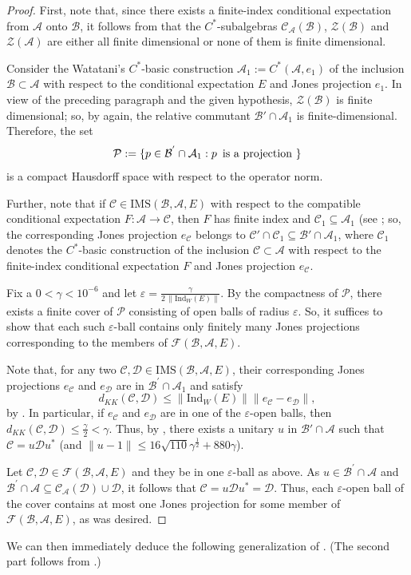 \documentclass{amsart}
\numberwithin{equation}{section}
\newcommand{\IMS}{\mathrm{IMS}}
\newcommand{\mcal}{\mathcal}
\newcommand{\1}{\mathbf{1}}
\newcommand{\mA}{\mathcal{A}}
\newcommand{\mB}{\mathcal{B}}
\newcommand{\mC}{\mathcal{C}}
\newcommand{\mD}{\mathcal{D}}
\newcommand{\mZ}{\mathcal{Z}}
\begin{document}
\begin{proof}
First,   note that,   since there exists a finite-index conditional
  expectation from $\mA$ onto $\mB$, it follows from \cite[Proposition
    2.7.3]{Wat} that the $C^*$-subalgebras $\mcal{C}_{\mA}(\mB)$,
  $\mcal{Z}(\mB)$ and  $\mcal{Z}(\mA)$ are either all finite
  dimensional or none of them is finite dimensional.


  Consider the Watatani's $C^*$-basic construction $\mA_1:=C^*(\mA,
  e_1)$ of the inclusion $\mB \subset \mA$ with respect to the
  conditional expectation $E$ and Jones projection $e_1$. In view of
  the preceding paragraph and the given hypothesis, $\mZ(\mB)$ is finite
  dimensional; so, by \cite[Proposition 2.7.3]{Wat} again, the
  relative commutant $\mB'\cap \mA_1$ is finite-dimensional.  Therefore,
  the set
\[
\mathcal{P}:=\{p\in \mB^{'}\cap \mA_1 :   p \mbox{\, is a projection }\}   
\]
is a compact Hausdorff space with respect to the operator norm.

Further, note that if $\mC \in \IMS(\mB, \mA, E)$ with respect to the
compatible conditional expectation $F: \mA \to \mC$, then $F$ has
finite index and $\mC_1 \subseteq \mA_1$ (see \cite[Prop. 2.7(2)]{GS}; so, the
corresponding Jones projection $e_{\mC}$ belongs to $\mC'\cap \mC_1
\subseteq \mB'\cap \mA_1$, where
$\mC_1$ denotes the $C^*$-basic construction of the inclusion $\mC
\subset \mA$ with respect to the finite-index conditional expectation
$F$ and Jones projection $e_{\mC}$.

Fix a $0 < \gamma < 10^{-6}$ and let $\varepsilon =
\frac{\gamma}{2\, \| \mathrm{Ind}_W(E)\|}$. By the compactness of
$\mcal{P}$, there exists a finite cover of $\mcal{P}$ consisting of
open balls of radius $\varepsilon$. So, it suffices to show that each
such $\varepsilon$-ball contains only finitely many Jones projections
corresponding to the members of $\mcal{F}(\mB, \mA, E)$.

Note that, for any two $\mC, \mD\in \IMS(\mB, \mA, E)$, their corresponding
Jones projections $e_{\mC}$ and $e_{\mD}$ are in $ \mB^{'}\cap \mA_1$ and
satisfy
$$
d_{KK}(\mC,\mD)\leq \|\mathrm{Ind}_W(E)\| \|e_{\mC}-e_{\mD}\|,
$$ by \cite[Lemma 3.3]{IW}. In particular, if $e_{\mC}$ and $e_{\mD}$ are
in one of the $\varepsilon$-open balls, then $d_{KK}(\mC, \mD)\leq
\frac{\gamma}{2}< \gamma$. Thus, by \cite[Theorem 3.7]{Dickson}, there exists a unitary $u$ in $\mB'\cap \mA$
such that $\mC = u\mD u^{*}$ (and $\|u- 1\|\leq
16\sqrt{110}\gamma^{\frac{1}{2}}+ 880 \gamma$).

Let $\mC, \mD \in \mathcal{F}(\mB, \mA, E)$ and they be in one
$\varepsilon$-ball as above.  As $u\in \mB^{'}\cap \mA$ and
$\mB^{'}\cap \mA \subseteq \mC_{\mA}(\mD) \cup \mD$, it follows that
$\mC=u\mD u^{*}= \mD$. Thus, each $\varepsilon$-open ball of the cover
contains at most one Jones projection for some member of
$\mcal{F}(\mB, \mA, E)$, as was desired.
\end{proof}
We can then immediately deduce the following generalization of
\cite[Corollary 3.9]{IW}. (The second part follows from
.)
\end{document}
